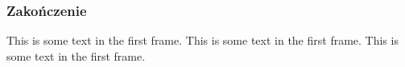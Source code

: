 \begin{frame}
    \frametitle{Zakończenie}
    This is some text in the first frame. This is some text in the first frame. This is some text in the first frame.
\end{frame}